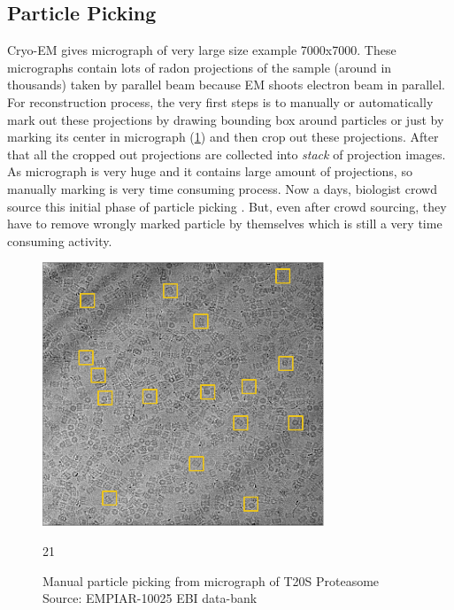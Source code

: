 \documentclass[twoside]{iitbreport}
\begin{document}
\subsection{Particle Picking}
Cryo-EM gives micrograph of very large size example 7000x7000. These micrographs contain lots of radon projections of the sample (around in thousands) taken by parallel beam because EM shoots electron beam in parallel. For reconstruction process, the very first steps is to manually or automatically mark out these projections by drawing bounding box around particles or just by marking its center in micrograph (\ref{fig:pp_from_micrograph}) and then crop out these projections. After that all the cropped out projections are collected into \textit{stack} of projection images. As micrograph is very huge and it contains large amount of projections, so manually marking is very time consuming process. Now a days, biologist crowd source this initial phase of particle picking \cite{bruggemann2017exploring}. But, even after crowd sourcing, they have to remove wrongly marked particle by themselves which is still a very time consuming activity.  

\begin{figure}[h]
\includegraphics[width=0.75\textwidth]{micrograph_pp_10025}
\centering
\captionsetup{justification=centering}
\caption{ Manual particle picking from micrograph of T20S Proteasome Source: EMPIAR-10025 EBI data-bank\protect\footnotemark} 
21

\label{fig:pp_from_micrograph}
\end{figure}
\end{document}
